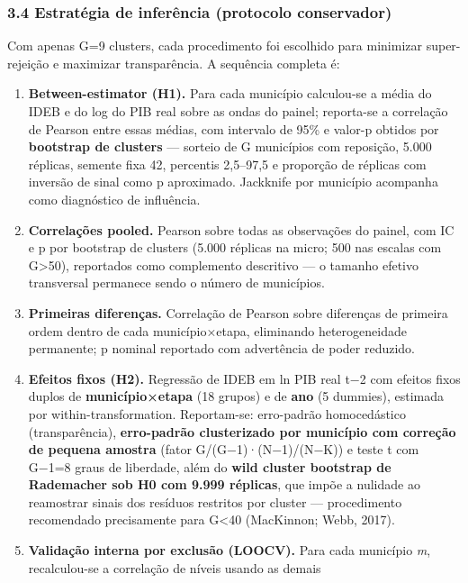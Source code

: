 \documentclass[
  brazilian,
  12pt,
  a4paper,
]{article}
\begin{document}
\subsubsection{3.4 Estratégia de inferência (protocolo
conservador)}\label{estratuxe9gia-de-inferuxeancia-protocolo-conservador}

Com apenas G=9 clusters, cada procedimento foi escolhido para minimizar
super-rejeição e maximizar transparência. A sequência completa é:

\begin{enumerate}
\def\labelenumi{\arabic{enumi}.}
\item
  \textbf{Between-estimator (H1).} Para cada município calculou-se a
  média do IDEB e do log do PIB real sobre as ondas do painel;
  reporta-se a correlação de Pearson entre essas médias, com intervalo
  de 95\% e valor-p obtidos por \textbf{bootstrap de clusters} ---
  sorteio de G municípios com reposição, 5.000 réplicas, semente fixa
  42, percentis 2,5--97,5 e proporção de réplicas com inversão de sinal
  como p aproximado. Jackknife por município acompanha como diagnóstico
  de influência.
\item
  \textbf{Correlações pooled.} Pearson sobre todas as observações do
  painel, com IC e p por bootstrap de clusters (5.000 réplicas na micro;
  500 nas escalas com G\textgreater50), reportados como complemento
  descritivo --- o tamanho efetivo transversal permanece sendo o número
  de municípios.
\item
  \textbf{Primeiras diferenças.} Correlação de Pearson sobre diferenças
  de primeira ordem dentro de cada município×etapa, eliminando
  heterogeneidade permanente; p nominal reportado com advertência de
  poder reduzido.
\item
  \textbf{Efeitos fixos (H2).} Regressão de IDEB em ln PIB real t−2 com
  efeitos fixos duplos de \textbf{município×etapa} (18 grupos) e de
  \textbf{ano} (5 dummies), estimada por within-transformation.
  Reportam-se: erro-padrão homocedástico (transparência),
  \textbf{erro-padrão clusterizado por município com correção de pequena
  amostra} (fator G/(G−1)·(N−1)/(N−K)) e teste t com G−1=8 graus de
  liberdade, além do \textbf{wild cluster bootstrap de Rademacher sob H0
  com 9.999 réplicas}, que impõe a nulidade ao reamostrar sinais dos
  resíduos restritos por cluster --- procedimento recomendado
  precisamente para G\textless40 (MacKinnon; Webb, 2017).
\item
  \textbf{Validação interna por exclusão (LOOCV).} Para cada município
  \emph{m}, recalculou-se a correlação de níveis usando as demais

\end{enumerate}
\end{document}
